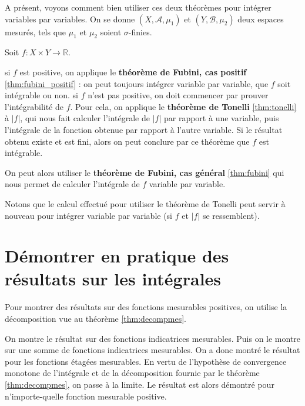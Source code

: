 \documentclass[../integ-proba.tex]{subfiles}
\begin{document}
  \begin{rem}
    A présent, voyons comment bien utiliser ces deux théorèmes pour intégrer variables par variables.
    On se donne $\left(X, \mathcal{A}, \mu_1\right)$ et $\left(Y, \mathcal{B}, \mu_2\right)$ deux espaces mesurés, tels que $\mu_1$ et $\mu_2$ soient $\sigma$-finies.

    Soit $f:X \times Y \rightarrow \mathbb{R}$.
    \begin{itemize}
      \itemb si $f$ est positive, on applique le \textbf{théorème de Fubini, cas positif} \ref{thm:fubini_positif} : on peut toujours intégrer variable par variable, que $f$ soit intégrable ou non.
      \itemb si $f$ n'est pas positive, on doit commencer par prouver l'intégrabilité de $f$.
      Pour cela, on applique le \textbf{théorème de Tonelli} \ref{thm:tonelli} à $\left|f\right|$, qui nous fait calculer l'intégrale de $\left|f\right|$ par rapport à une variable, puis l'intégrale de la fonction obtenue par rapport à l'autre variable.
      Si le résultat obtenu existe et est fini, alors on peut conclure par ce théorème que $f$ est intégrable.

      On peut alors utiliser le \textbf{théorème de Fubini, cas général} \ref{thm:fubini} qui nous permet de calculer l'intégrale de $f$ variable par variable.

      Notons que le calcul effectué pour utiliser le théorème de Tonelli peut servir à nouveau pour intégrer variable par variable (si $f$ et $\left|f\right|$ se ressemblent).
    \end{itemize}
  \end{rem}

  \section{Démontrer en pratique des résultats sur les intégrales}

  Pour montrer des résultats sur des fonctions mesurables positives, on utilise la décomposition vue au théorème \ref{thm:decompmes}.
  \begin{itemize}
    \itemb On montre le résultat sur des fonctions indicatrices mesurables.
    \itemb Puis on le montre sur une somme de fonctions indicatrices mesurables. On a donc montré le résultat pour les fonctions étagées mesurables.
    \itemb En vertu de l'hypothèse de convergence monotone de l'intégrale et de la décomposition fournie par le théorème \ref{thm:decompmes}, on passe à la limite.
    Le résultat est alors démontré pour n'importe-quelle fonction mesurable positive.
  \end{itemize}
\end{document}

